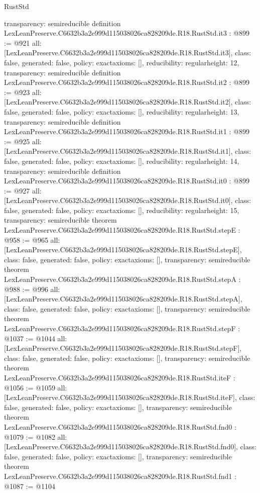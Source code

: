 \begin{lexlean}{RustStd}
\begin{coremodule}
{  transparency: semireducible
}
definition LexLeanPreserve.C6632b3a2e999d115038026ca828209de.R18.RustStd.it3 : @899 := @921 {
  all: [LexLeanPreserve.C6632b3a2e999d115038026ca828209de.R18.RustStd.it3],
  class: false,
  generated: false,
  policy: exact{axioms: []},
  reducibility: regular{height: 12},
  transparency: semireducible
}
definition LexLeanPreserve.C6632b3a2e999d115038026ca828209de.R18.RustStd.it2 : @899 := @923 {
  all: [LexLeanPreserve.C6632b3a2e999d115038026ca828209de.R18.RustStd.it2],
  class: false,
  generated: false,
  policy: exact{axioms: []},
  reducibility: regular{height: 13},
  transparency: semireducible
}
definition LexLeanPreserve.C6632b3a2e999d115038026ca828209de.R18.RustStd.it1 : @899 := @925 {
  all: [LexLeanPreserve.C6632b3a2e999d115038026ca828209de.R18.RustStd.it1],
  class: false,
  generated: false,
  policy: exact{axioms: []},
  reducibility: regular{height: 14},
  transparency: semireducible
}
definition LexLeanPreserve.C6632b3a2e999d115038026ca828209de.R18.RustStd.it0 : @899 := @927 {
  all: [LexLeanPreserve.C6632b3a2e999d115038026ca828209de.R18.RustStd.it0],
  class: false,
  generated: false,
  policy: exact{axioms: []},
  reducibility: regular{height: 15},
  transparency: semireducible
}
theorem LexLeanPreserve.C6632b3a2e999d115038026ca828209de.R18.RustStd.stepE : @958 := @965 {
  all: [LexLeanPreserve.C6632b3a2e999d115038026ca828209de.R18.RustStd.stepE],
  class: false,
  generated: false,
  policy: exact{axioms: []},
  transparency: semireducible
}
theorem LexLeanPreserve.C6632b3a2e999d115038026ca828209de.R18.RustStd.stepA : @988 := @996 {
  all: [LexLeanPreserve.C6632b3a2e999d115038026ca828209de.R18.RustStd.stepA],
  class: false,
  generated: false,
  policy: exact{axioms: []},
  transparency: semireducible
}
theorem LexLeanPreserve.C6632b3a2e999d115038026ca828209de.R18.RustStd.stepF : @1037 := @1044 {
  all: [LexLeanPreserve.C6632b3a2e999d115038026ca828209de.R18.RustStd.stepF],
  class: false,
  generated: false,
  policy: exact{axioms: []},
  transparency: semireducible
}
theorem LexLeanPreserve.C6632b3a2e999d115038026ca828209de.R18.RustStd.iteF : @1056 := @1059 {
  all: [LexLeanPreserve.C6632b3a2e999d115038026ca828209de.R18.RustStd.iteF],
  class: false,
  generated: false,
  policy: exact{axioms: []},
  transparency: semireducible
}
theorem LexLeanPreserve.C6632b3a2e999d115038026ca828209de.R18.RustStd.fnd0 : @1079 := @1082 {
  all: [LexLeanPreserve.C6632b3a2e999d115038026ca828209de.R18.RustStd.fnd0],
  class: false,
  generated: false,
  policy: exact{axioms: []},
  transparency: semireducible
}
theorem LexLeanPreserve.C6632b3a2e999d115038026ca828209de.R18.RustStd.fnd1 : @1087 := @1104 {
}
\end{coremodule}
\end{lexlean}
